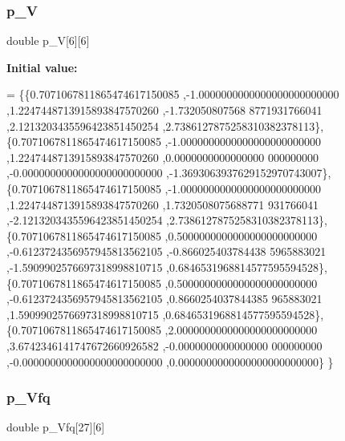 \subsubsection{\texorpdfstring{p\+\_\+V}{p\_V}}
{\footnotesize\ttfamily double p\+\_\+V\mbox{[}6\mbox{]}\mbox{[}6\mbox{]}}

{\bfseries Initial value\+:}
\begin{DoxyCode}
= \{\{0.7071067811865474617150085 ,-1.0000000000000000000000000 ,1.2247448713915893847570260 ,-1.732050807568
      8771931766041 ,2.1213203435596423851450254 ,2.7386127875258310382378113\},
\{0.7071067811865474617150085 ,-1.0000000000000000000000000 ,1.2247448713915893847570260 ,0.0000000000000000
      000000000 ,-0.0000000000000000000000000 ,-1.3693063937629152970743007\},
\{0.7071067811865474617150085 ,-1.0000000000000000000000000 ,1.2247448713915893847570260 ,1.7320508075688771
      931766041 ,-2.1213203435596423851450254 ,2.7386127875258310382378113\},
\{0.7071067811865474617150085 ,0.5000000000000000000000000 ,-0.6123724356957945813562105 ,-0.866025403784438
      5965883021 ,-1.5909902576697318998810715 ,0.6846531968814577595594528\},
\{0.7071067811865474617150085 ,0.5000000000000000000000000 ,-0.6123724356957945813562105 ,0.8660254037844385
      965883021 ,1.5909902576697318998810715 ,0.6846531968814577595594528\},
\{0.7071067811865474617150085 ,2.0000000000000000000000000 ,3.6742346141747672660926582 ,-0.0000000000000000
      000000000 ,-0.0000000000000000000000000 ,0.0000000000000000000000000\}
\}
\end{DoxyCode}
\mbox{\label{a00990_a6be1ead25f679120d553a0ff0fb72014}} 
\subsubsection{\texorpdfstring{p\+\_\+\+Vfq}{p\_Vfq}}
{\footnotesize\ttfamily double p\+\_\+\+Vfq\mbox{[}27\mbox{]}\mbox{[}6\mbox{]}}

